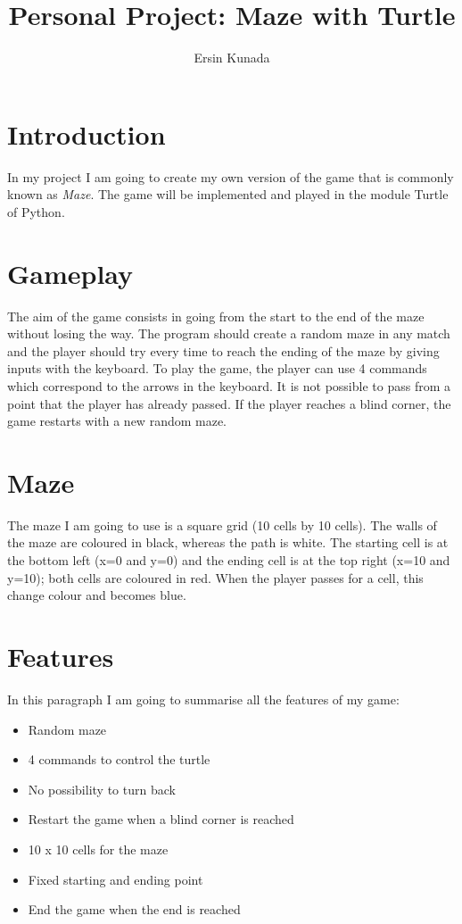 \documentclass[11pt]{article}
\title{\textbf{Personal Project: Maze with Turtle}}
\author{Ersin Kunada}
\date{}
\begin{document}
\maketitle

\section*{Introduction}
In my project I am going to create my own version of the game that is commonly known as \textit{Maze}. The game will be implemented and played in the module Turtle of Python.

\section*{Gameplay}
The aim of the game consists in going from the start to the end of the maze without losing the way.
The program should create a random maze in any match and the player should try every time to reach the ending of the maze by giving inputs with the keyboard. To play the game, the player can use 4 commands which correspond to the arrows in the keyboard. It is not possible to pass from a point that the player has already passed. If the player reaches a blind corner, the game restarts with a new random maze.

\section*{Maze}
The maze I am going to use is a square grid (10 cells by 10 cells). The walls of the maze are coloured in black, whereas the path is white. The starting cell is at the bottom left (x=0 and y=0) and the ending cell is at the top right (x=10 and y=10); both cells are coloured in red. When the player passes for a cell, this change colour and becomes blue.

\section*{Features}
In this paragraph I am going to summarise all the features of my game:
\begin{itemize}
\item Random maze 
\item 4 commands to control the turtle
\item No possibility to turn back
\item Restart the game when a blind corner is reached
\item 10 x 10 cells for the maze
\item Fixed starting and ending point
\item End the game when the end is reached
\end{itemize}
\end{document}
